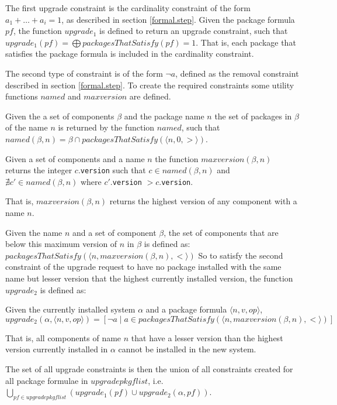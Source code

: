 The first upgrade constraint is the cardinality constraint of the form $a_1 + \ldots + a_i = 1$, as described in section \ref{formal.step}.
Given the package formula $pf$, the function $upgrade_1$ is defined to return an upgrade constraint,
such that $upgrade_1(pf) = \bigoplus packagesThatSatisfy(pf) = 1$.
That is, each package that satisfies the package formula is included in the cardinality constraint.

The second type of constraint is of the form $\neg a$, defined as the removal constraint described in section \ref{formal.step}.
To create the required constraints some utility functions $named$ and $maxversion$ are defined.

\begin{defs}
Given the a set of components $\beta$ and the package name $n$ the set of packages in $\beta$ of the name $n$ is returned by the function $named$, such that
$named(\beta,n) = \beta \cap packagesThatSatisfy(\langle n,0,> \rangle)$.
\end{defs} 

\begin{defs}
Given a set of components and a name $n$ the function $maxversion(\beta,n)$ returns the integer $c$.\verb+version+ 
such that $c \in named(\beta,n)$ and $\nexists c' \in named(\beta,n)$ where $c'$.\verb+version+ $> c$.\verb+version+.
\end{defs}
That is, $maxversion(\beta,n)$ returns the highest version of any component with a name $n$.

Given the name $n$ and a set of component $\beta$, the set of components that are below this maximum version of $n$ in $\beta$ is defined as:
$packagesThatSatisfy(\langle n, maxversion(\beta,n), < \rangle)$
So to satisfy the second constraint of the upgrade request to have no package installed with the same name but lesser version that the highest currently installed version,
the function  $upgrade_2$ is defined as:
\begin{defs}
Given the currently installed system $\alpha$ and a package formula $\langle n,v,op \rangle$,
$upgrade_2(\alpha,\langle n,v,op \rangle) = [\neg a \mid a \in packagesThatSatisfy(\langle n, maxversion(\beta,n), < \rangle)]$
\end{defs}
That is, all components of name $n$ that have a lesser version than the highest version currently installed in $\alpha$ cannot be installed in the new system. 

The set of all upgrade constraints is then the union of all constraints created for all package formulae in $upgradepkgflist$,
i.e. $\bigcup \limits_{pf \in upgradepkgflist} (upgrade_1(pf) \cup upgrade_2(\alpha,pf))$.

